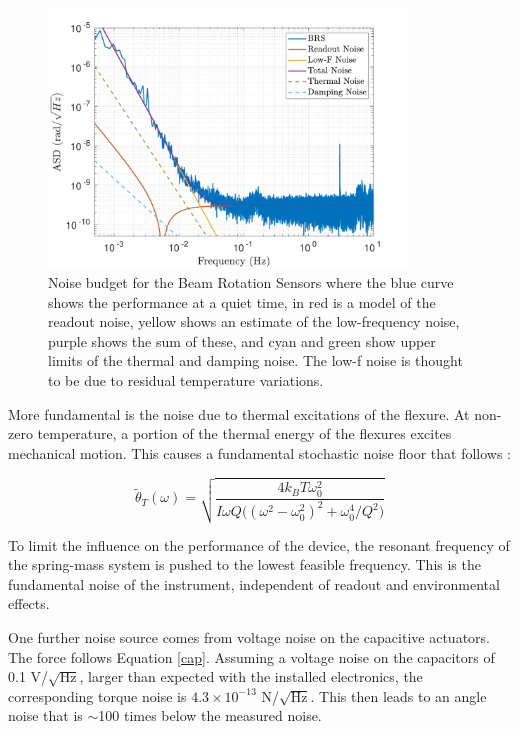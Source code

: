 \documentclass [12pt, proquest]{uwthesis}[2019]
\begin{document}
\begin{figure}
\begin{center}
\includegraphics[width=0.85\textwidth]{BRSNoiseModel.pdf}
\caption[Noise budge for the Beam Rotation Sensors]{Noise budget for the Beam Rotation Sensors where the blue curve shows the performance at a quiet time, in red is a model of the readout noise, yellow shows an estimate of the low-frequency noise, purple shows the sum of these, and cyan and green show upper limits of the thermal and damping noise. The low-f noise is thought to be due to residual temperature variations.}
\label{noise}
\end{center}
\end{figure}

More fundamental is the noise due to thermal excitations of the flexure. At non-zero temperature, a portion of the thermal energy of the flexures excites mechanical motion. This causes a fundamental stochastic noise floor that follows \cite{thermal}:

\begin{equation}
\tilde\theta_T(\omega)=\sqrt{\frac{4 k_B T \omega_0^2}{I \omega Q\big((\omega^2-\omega_0^2)^2+\omega_0^4/Q^2\big)}}
\end{equation}

To limit the influence on the performance of the device, the resonant frequency of the spring-mass system is pushed to the lowest feasible frequency. This is the fundamental noise of the instrument, independent of readout and environmental effects.

 One further noise source comes from voltage noise on the capacitive actuators. The force follows Equation \ref{cap}. Assuming a voltage noise on the capacitors of 0.1 V/$\sqrt{\text{Hz}}$, larger than expected with the installed electronics, the corresponding torque noise is $4.3 \times 10^{-13}$ N/$\sqrt{\text{Hz}}$. This then leads to an angle noise that is $\sim$100 times below the measured noise.
\end{document}
